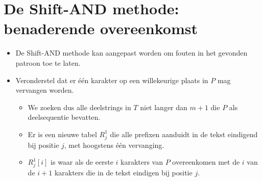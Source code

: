\section{De Shift-AND methode: benaderende overeenkomst}
\begin{itemize}
    \item De Shift-AND methode kan aangepast worden om fouten in het gevonden patroon toe te laten.
    \item Veronderstel dat er één karakter op een willekeurige plaats in $P$ mag vervangen worden.
    \begin{itemize}
        \item We zoeken dus alle deelstrings in $T$ niet langer dan $m + 1$ die $P$ als deelsequentie bevatten.
        \item Er is een nieuwe tabel $R_j^1$ die alle prefixen aanduidt in de tekst eindigend bij positie $j$, met hoogstens één vervanging.
        \item $R_j^1[i]$ is waar als de eerste $i$ karakters van $P$ overeenkomen met de $i$ van de $i + 1$ karakters die in de tekst eindigen bij positie $j$.
    \end{itemize}
\end{itemize}
